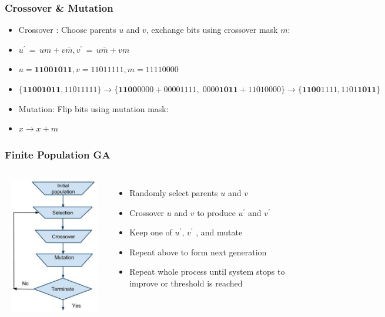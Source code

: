 \documentclass[aspectratio=169]{beamer}
\begin{document}
  \begin{frame}
    \frametitle{Crossover \& Mutation}
    \begin{itemize}
      \item{Crossover : Choose parents $u$ and $v$, exchange bits using crossover mask $m$: }
      \item{$u^\prime \,=\, um + v\bar{m} , v^\prime \,=\, u\bar{m} + vm$}      
      \item{$u = \bm{11001011}, v = 11011111, m = 11110000$}
      \item{$\{\bm{11001011}, 11011111\} \to \{\bm{1100}0000 + 00001111,\; 0000\bm{1011} + 11010000\} \to \{\bm{1100}1111, 1101\bm{1011}\}$}
      \item{Mutation: Flip bits using mutation mask:}
      \item{$x \to x + m$}
    \end{itemize}
  \end{frame}
  
  \begin{frame}
    \frametitle{Finite Population GA}
    \begin{columns}
             \centering
             \includegraphics[height=6cm, width=7cm]{figures/eps/GA.eps}
	    \begin{itemize}
              \item{Randomly select parents $u$ and $v$ }
              \item{Crossover $u$ and $v$ to produce $u^\prime$ and $v^\prime$ }
              \item{Keep one of $u^\prime$, $v^\prime$ , and mutate}
              \item{Repeat above to form next generation}
              \item{Repeat whole process until system stops  to improve or threshold is reached}
	    \end{itemize}
         \end{columns} 
  \end{frame}
  
\end{document}
